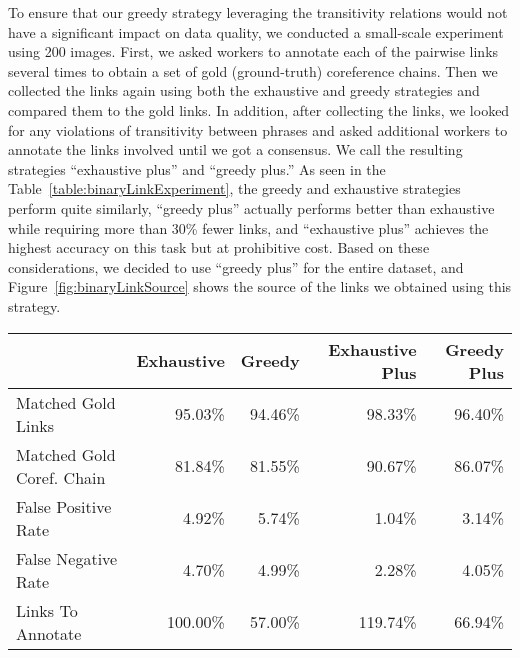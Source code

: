 \documentclass[twocolumn]{svjour3}
\begin{document}
To ensure that our greedy strategy leveraging the transitivity relations would not have a significant impact on data quality, we conducted a small-scale experiment using 200 images.  First, we asked workers to annotate each of the  pairwise links several times to obtain a set of gold (ground-truth) coreference chains.  Then we collected the links again using both the exhaustive and greedy strategies and compared them to the gold links. In addition, after collecting the links, we looked for any violations of transitivity between phrases and asked additional workers to annotate the links involved until we got a consensus. We call the resulting strategies ``exhaustive plus'' and ``greedy plus.'' As seen in the Table~\ref{table:binaryLinkExperiment}, the greedy and exhaustive strategies perform quite similarly, ``greedy plus'' actually performs better than exhaustive while requiring more than 30\% fewer links, and ``exhaustive plus'' achieves the highest accuracy on this task but at prohibitive cost. Based on these considerations, we decided to use ``greedy plus'' for the entire dataset, and Figure~\ref{fig:binaryLinkSource} shows the source of the links we obtained using this strategy. 

\begin{table*}
\caption{Comparison of different annotation strategies for collecting binary coreference links on 200 images.  We report the false positive/negative rates for the individual binary link judgments, as well as how many of the coreference chains created by the different strategies matched the gold coreference chains.}
\label{table:binaryLinkExperiment}
\begin{tabular}{|l|r|r|r|r|}
\hline
 & Exhaustive & Greedy & Exhaustive Plus & Greedy Plus \\
\hline
\hline
Matched Gold Links & 95.03\% & 94.46\% & 98.33\% & 96.40\% \\
Matched Gold Coref. Chain & 81.84\% & 81.55\% & 90.67\% & 86.07\% \\
False Positive Rate & 4.92\% & 5.74\%  & 1.04\% & 3.14\% \\
False Negative Rate & 4.70\% & 4.99\% & 2.28\% & 4.05\% \\
\hline
Links To Annotate & 100.00\% & 57.00\% & 119.74\% & 66.94\%\\
\hline
\end{tabular}
\end{table*}
\end{document}
